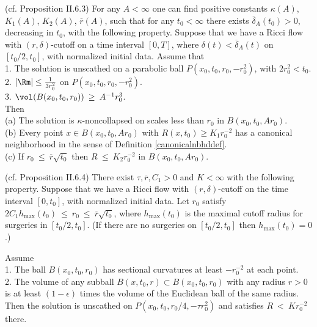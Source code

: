 \begin{proposition}
  \label{prop:kl-proof-double-sided-curvature-bound-thick-part-modulo-two-propositions-existence-canonical-neighborhoods}
 \label{propII.6.3}
(cf. Proposition II.6.3)
For any
$A < \infty$
one can find positive constants
$\kappa(A)$, $K_1(A)$, $K_2(A)$, $\overline{r}(A)$,
such that for any $t_0 < \infty$
there exists $\overline{\delta}_{A}(t_0)
> 0$, decreasing in $t_0$,
with the following property.  Suppose that
we have a Ricci flow with $(r, \delta)$-cutoff on a time interval
$[0, T]$, where $\delta(t) < \overline{\delta}_A(t)$ on $[t_0/2, t_0]$, with
normalized initial data.  Assume that \\
1. The solution is unscathed on a parabolic ball
$P(x_0, t_0, r_0, -r_0^2)$, with $2r_0^2 < t_0$. \\
2. $|\Rm| \le \frac{1}{3r_0^2}$ on $P(x_0, t_0, r_0, -r_0^2)$. \\
3. $\vol(B(x_0, t_0, r_0)) \: \ge \: A^{-1} r_0^3$.\\

Then\\
(a) The solution is $\kappa$-noncollapsed on scales less than $r_0$
in $B(x_0, t_0, Ar_0)$.\\
(b) Every point $x \in B(x_0, t_0, Ar_0)$ with $R(x, t_0) \ge K_1 r_0^{-2}$
has a canonical neighborhood in the sense of
Definition \ref{canonicalnbhddef}.\\
(c) If $r_0 \: \le \: \overline{r} \sqrt{t_0}$ then $R \: \le \: K_2
r_0^{-2}$ in $B(x_0, t_0, Ar_0)$.
\end{proposition}

\begin{proposition}
  \label{prop:kl-proof-double-sided-curvature-bound-thick-part-modulo-two-propositions-existence-thick-thin-geometry}
 \label{propII.6.4}
(cf. Proposition II.6.4)
There exist $\tau, \overline{r}, C_1 > 0$ and $K < \infty$ with the
following property. Suppose that we have a Ricci flow with $(r, \delta)$-cutoff
on the time interval $[0, t_0]$, with normalized initial data.
  Let $r_0$ satisfy
$2C_1 h_{\max}(t_0) \: \le \: r_0 \: \le \: \overline{r} \sqrt{t_0}$,
where $h_{\max}(t_0)$ is the maximal cutoff radius for surgeries in
$[t_0/2, t_0]$. (If there are no surgeries on $[t_0/2, t_0]$ then
$h_{\max}(t_0) = 0$.)

Assume \\
1. The ball $B(x_0, t_0, r_0)$ has sectional curvatures at least $- r_0^{-2}$
at each point. \\
2. The volume of any subball $B(x, t_0, r) \subset B(x_0, t_0, r_0)$ with
any radius $r > 0$ is at least $(1-\epsilon)$ times the volume of the
Euclidean ball of the same radius.\\

Then the solution is unscathed on
$P(x_0, t_0, r_0/4, - \tau r_0^2)$
and satisfies $R \: < \: K r_0^{-2}$ there.
\end{proposition}

